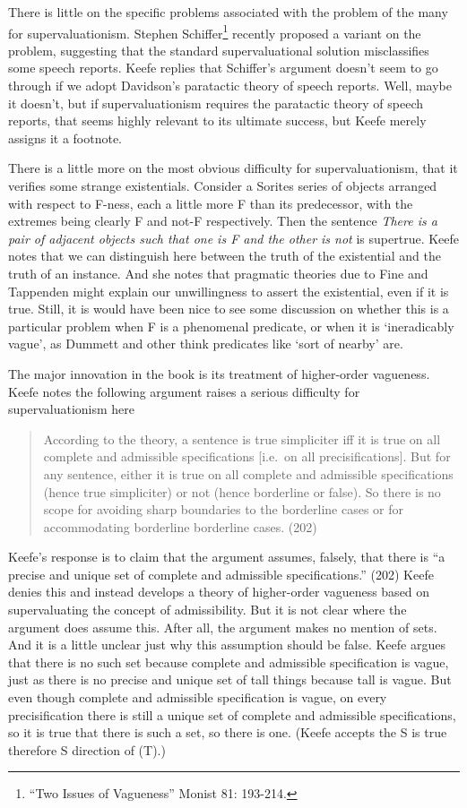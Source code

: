 \documentclass[
  11pt,
  letterpaper,
  DIV=11,
  numbers=noendperiod,
  twoside]{scrartcl}
\begin{document}
There is little on the specific problems associated with the problem of
the many for supervaluationism. Stephen Schiffer\footnote{``Two Issues
  of Vagueness'' Monist 81: 193-214.} recently proposed a variant on the
problem, suggesting that the standard supervaluational solution
misclassifies some speech reports. Keefe replies that Schiffer's
argument doesn't seem to go through if we adopt Davidson's paratactic
theory of speech reports. Well, maybe it doesn't, but if
supervaluationism requires the paratactic theory of speech reports, that
seems highly relevant to its ultimate success, but Keefe merely assigns
it a footnote.

There is a little more on the most obvious difficulty for
supervaluationism, that it verifies some strange existentials. Consider
a Sorites series of objects arranged with respect to F-ness, each a
little more F than its predecessor, with the extremes being clearly F
and not-F respectively. Then the sentence \emph{There is a pair of
adjacent objects such that one is F and the other is not} is supertrue.
Keefe notes that we can distinguish here between the truth of the
existential and the truth of an instance. And she notes that pragmatic
theories due to Fine and Tappenden might explain our unwillingness to
assert the existential, even if it is true. Still, it is would have been
nice to see some discussion on whether this is a particular problem when
F is a phenomenal predicate, or when it is `ineradicably vague', as
Dummett and other think predicates like `sort of nearby' are.

The major innovation in the book is its treatment of higher-order
vagueness. Keefe notes the following argument raises a serious
difficulty for supervaluationism here

\begin{quote}
According to the theory, a sentence is true simpliciter iff it is true
on all complete and admissible specifications {[}i.e.~on all
precisifications{]}. But for any sentence, either it is true on all
complete and admissible specifications (hence true simpliciter) or not
(hence borderline or false). So there is no scope for avoiding sharp
boundaries to the borderline cases or for accommodating borderline
borderline cases. (202)
\end{quote}

Keefe's response is to claim that the argument assumes, falsely, that
there is ``a precise and unique set of complete and admissible
specifications.'' (202) Keefe denies this and instead develops a theory
of higher-order vagueness based on supervaluating the concept of
admissibility. But it is not clear where the argument does assume this.
After all, the argument makes no mention of sets. And it is a little
unclear just why this assumption should be false. Keefe argues that
there is no such set because complete and admissible specification is
vague, just as there is no precise and unique set of tall things because
tall is vague. But even though complete and admissible specification is
vague, on every precisification there is still a unique set of complete
and admissible specifications, so it is true that there is such a set,
so there is one. (Keefe accepts the S is true therefore S direction of
(T).)
\end{document}
